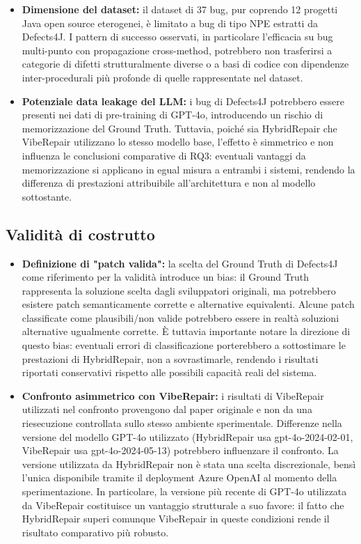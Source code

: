 \begin{itemize}
        \item \textbf{Dimensione del dataset:} il dataset di 37 bug, pur coprendo 12 progetti Java open source eterogenei,
        è limitato a bug di tipo NPE estratti da Defects4J. I pattern di successo osservati, in particolare
        l'efficacia su bug multi-punto con propagazione cross-method, potrebbero non trasferirsi a categorie
        di difetti strutturalmente diverse o a basi di codice con dipendenze inter-procedurali più profonde
        di quelle rappresentate nel dataset.
        \item \textbf{Potenziale data leakage del LLM:} i bug di Defects4J potrebbero essere presenti nei dati
        di pre-training di GPT-4o, introducendo un rischio di memorizzazione del Ground Truth. Tuttavia, poiché
        sia HybridRepair che VibeRepair utilizzano lo stesso modello base, l'effetto è simmetrico e non influenza
        le conclusioni comparative di RQ3: eventuali vantaggi da memorizzazione si applicano in egual misura a
        entrambi i sistemi, rendendo la differenza di prestazioni attribuibile all'architettura e non al modello
        sottostante.
\end{itemize}

\subsection{Validità di costrutto}

\begin{itemize}
  \item \textbf{Definizione di "patch valida":} la scelta del Ground Truth di Defects4J come riferimento per la validità
  introduce un bias: il Ground Truth rappresenta la soluzione scelta dagli sviluppatori originali, ma potrebbero
  esistere patch semanticamente corrette e alternative equivalenti. Alcune patch classificate come plausibili/non valide
  potrebbero essere in realtà soluzioni alternative ugualmente corrette. È tuttavia importante notare la direzione
  di questo bias: eventuali errori di classificazione porterebbero a sottostimare le prestazioni di HybridRepair,
  non a sovrastimarle, rendendo i risultati riportati conservativi rispetto alle possibili capacità reali del sistema.
  \item \textbf{Confronto asimmetrico con VibeRepair:} i risultati di VibeRepair utilizzati nel confronto
  provengono dal paper originale e non da una riesecuzione controllata sullo stesso ambiente sperimentale.
  Differenze nella versione del modello GPT-4o utilizzato
  (HybridRepair usa gpt-4o-2024-02-01, VibeRepair usa gpt-4o-2024-05-13) potrebbero influenzare
  il confronto. La versione utilizzata da HybridRepair non è stata una scelta discrezionale, bensì
  l'unica disponibile tramite il deployment Azure OpenAI al momento della sperimentazione.
  In particolare, la versione più recente di GPT-4o utilizzata da VibeRepair costituisce un
  vantaggio strutturale a suo favore: il fatto che HybridRepair superi comunque VibeRepair in queste
  condizioni rende il risultato comparativo più robusto.
\end{itemize}

